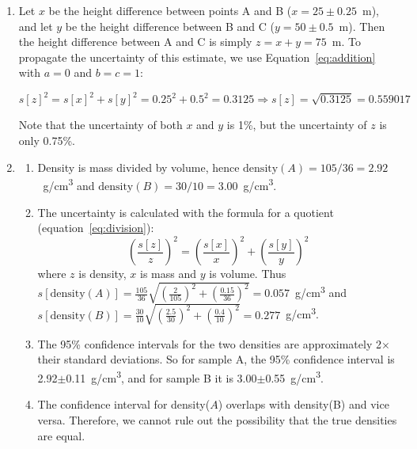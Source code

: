\begin{enumerate}
\item Let $x$ be the height difference between points A and B
  ($x=25\pm0.25$~m), and let $y$ be the height difference between B
  and C ($y=50\pm0.5$~m). Then the height difference between A and C
  is simply $z=x+y=75$~m. To propagate the uncertainty of this
  estimate, we use Equation~\ref{eq:addition} with $a=0$ and $b=c=1$:

  \[
  s[z]^2 = s[x]^2 + s[y]^2 = 0.25^2 + 0.5^2 = 0.3125
  \Rightarrow s[z] = \sqrt{0.3125} = 0.559017
  \]

  Note that the uncertainty of both $x$ and $y$ is 1\%, but the
  uncertainty of $z$ is only 0.75\%.

\item \begin{enumerate}

\item Density is mass divided by volume, hence $\mbox{density}(A) =
  105/36 = 2.92$~g/cm\textsuperscript{3} and $\mbox{density}(B) =
  30/10 = 3.00$~g/cm\textsuperscript{3}.

\item The uncertainty is calculated with the formula for a quotient
  (equation~\ref{eq:division}):
\[
\left(\frac{s[z]}{z}\right)^2 = \left(\frac{s[x]}{x}\right)^2 +
    \left(\frac{s[y]}{y}\right)^2
\]
\noindent where $z$ is density, $x$ is mass and $y$ is volume. Thus
$s[\mbox{density}(A)] =
\frac{105}{36}\sqrt{\left(\frac{2}{105}\right)^2+\left(\frac{0.15}{36}\right)^2}=0.057$~g/cm\textsuperscript{3}
and $s[\mbox{density}(B)] =
\frac{30}{10}\sqrt{\left(\frac{2.5}{30}\right)^2+\left(\frac{0.4}{10}\right)^2}=0.277$~g/cm\textsuperscript{3}.
\item The 95\% confidence intervals for the two densities are
  approximately 2$\times$ their standard deviations. So for sample A,
  the 95\% confidence interval is
  2.92$\pm$0.11~g/cm\textsuperscript{3}, and for sample B it is
  3.00$\pm$0.55~g/cm\textsuperscript{3}.
\item The confidence interval for density($A$) overlaps with
  density(B) and vice versa. Therefore, we cannot rule out the
  possibility that the true densities are equal.
\end{enumerate}


\end{enumerate}
